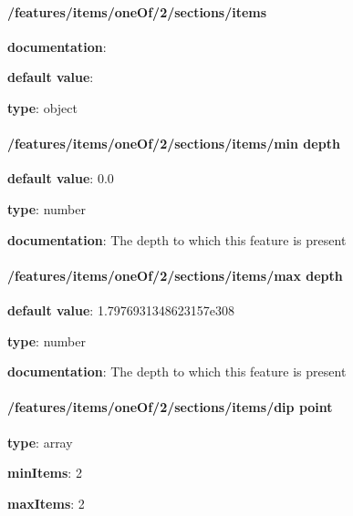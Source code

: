 \begin{itemized}
\paragraph{/features/items/oneOf/2/sections/items} \begin{itemized}
\item {\bf documentation}: 
\item {\bf default value}: 
\item {\bf type}: object
\end{itemized}\end{itemized}
\paragraph{/features/items/oneOf/2/sections/items/min depth} \begin{itemized}
\item {\bf default value}: 0.0
\item {\bf type}: number
\item {\bf documentation}: The depth to which this feature is present
\end{itemized}\paragraph{/features/items/oneOf/2/sections/items/max depth} \begin{itemized}
\item {\bf default value}: 1.7976931348623157e308
\item {\bf type}: number
\item {\bf documentation}: The depth to which this feature is present
\end{itemized}\paragraph{/features/items/oneOf/2/sections/items/dip point} \begin{itemized}
\item {\bf type}: array
\item {\bf minItems}: 2
\item {\bf maxItems}: 2

\end{itemized}
